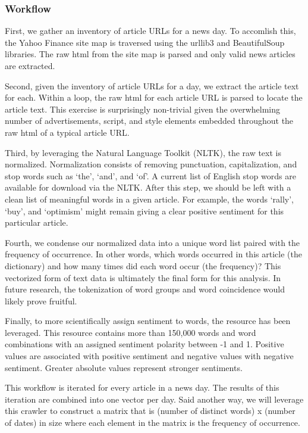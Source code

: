 \documentclass{article}
\begin{document}
\subsubsection{Workflow}
First, we gather an inventory of article URLs for a news day.  To accomlish this, the Yahoo Finance site map is traversed using the urllib3 and BeautifulSoup libraries.  The raw html from the site map is parsed and only valid news articles are extracted.  

Second, given the inventory of article URLs for a day, we extract the article text for each.  Within a loop, the raw html for each article URL is parsed to locate the article text.  This exercise is surprisingly non-trivial given the overwhelming number of advertisements, script, and style elements embedded throughout the raw html of a typical article URL.  

Third, by leveraging the Natural Language Toolkit (NLTK), the raw text is normalized.  Normalization consists of removing punctuation, capitalization, and stop words such as ‘the’, ‘and’, and ‘of’.  A current list of English stop words are available for download via the NLTK.  After this step, we should be left with a clean list of meaningful words in a given article.  For example, the words ‘rally’, ‘buy’, and ‘optimism’ might remain giving a clear positive sentiment for this particular article.

Fourth, we condense our normalized data into a unique word list paired with the frequency of occurrence.  In other words, which words occurred in this article (the dictionary) and how many times did each word occur (the frequency)?  This vectorized form of text data is ultimately the final form for this analysis.  In future research, the tokenization of word groups and word coincidence would likely prove fruitful.

Finally, to more scientifically assign sentiment to words, the \href{https://hlt-nlp.fbk.eu/technologies/sentiwords}{\color{blue}{SentiWords}} resource has been leveraged.  This resource contains more than 150,000 words and word combinations with an assigned sentiment polarity between -1 and 1.  Positive values are associated with positive sentiment and negative values with negative sentiment.  Greater absolute values represent stronger sentiments.

This workflow is iterated for every article in a news day.  The results of this iteration are combined into one vector per day.  Said another way, we will leverage this crawler to construct a matrix that is (number of distinct words) x (number of dates) in size where each element in the matrix is the frequency of occurrence.
\end{document}
